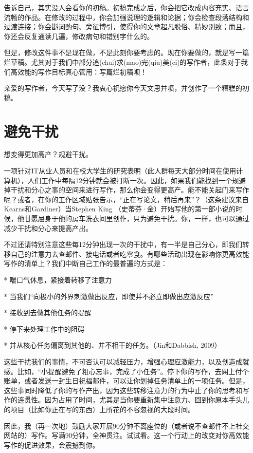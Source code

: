 \documentclass{ctexart}
\begin{document}
告诉自己，其实没人会看你的初稿。初稿完成之后，你会把它改成内容充实、语言流畅的作品。在修改的过程中，你会加强说理的逻辑和论据；你会检查段落结构和过渡连接；你会斟词酌句、旁征博引，使得你的文章超凡脱俗、精妙别致；而且，你还会反复通读几遍，修改病句和错别字什么的。

但是，修改这件事不是现在做，不是此刻你要考虑的。现在你要做的，就是写一篇烂草稿。尤其对于我们中部分追(chui)求(mao)完(qiu)美(ci)的写作者，此条对于我们高效能的写作目标真心管用：写篇烂初稿呗！

亲爱的写作者，今天写了没？我衷心祝愿你今天文思井喷，并创作了一个糟糕的初稿。

\section{避免干扰}
想变得更加高产？规避干扰。

一项针对IT从业人员和在校大学生的研究表明（此人群每天大部分时间在使用计算机），人们工作中每隔12分钟就会被打断一次。因此，如果我们能找到一个规避掉干扰和分心之事的空间来进行写作，那么你会变得更高产。能不能关起门来写作呢？或者，在你的工作区域贴张告示，“正在写论文，稍后再来”？（这条建议来自Kearns和Gardiner）当Stephen King （史蒂芬·金）开始写他的第一部小说的时候，他甘愿屈身于他的房车洗衣间里创作，只为避免干扰。你，一样，也可以通过减少干扰和分心来提高产出。

不过还请特别注意这些每12分钟出现一次的干扰中，有一半是自己分心，即我们转移自己的注意力去查邮件、接电话或者吃零食。有哪些活动出现在影响你更高效能写作的清单上？我们中断自己工作的最普遍的方式是：

* 喘口气休息，紧接着转移了注意力

* 当我们“向极小的外界刺激做出反应，即使并不必立即做出应激反应”

* 接收到去做其他任务的提醒

* 停下来处理工作中的阻碍

* 并从核心任务偏离到其他的、并不相干的任务。（Jin和Dabbish, 2009）

这些干扰我们的事情，不可否认可以减轻压力，增强心理应激能力，以及创造成就感。比如，“小提醒避免了粗心忘事，完成了小任务”。停下你的写作，去网上付个账单，或者发送一封生日祝福邮件，可以让你划掉任务清单上的一项任务。但是，这些事同时降低了你的写作产出，因为这些转移注意力的行为中止了你的思考和写作的连贯性。因为占用了时间，尤其是当你要重新集中注意力、回到你原本手头儿的项目（比如你正在写的东西）上所花的不容忽视的大段时间。

因此，我（再一次地）鼓励大家开展90分钟不离座位的（或者说不查邮件不上社交网站的）写作。写满90分钟，全神贯注。试试看。这一个行动上的改变对你高效能写作的促进效果，会震撼到你。
\end{document}

